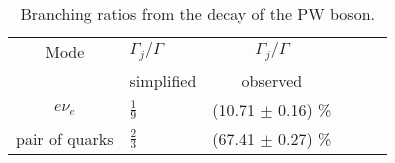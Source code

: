 \documentclass{report}
\begin{document}
\begin{table}[h!]
  \centering
  \caption{Branching ratios from the decay of the PW boson.}
  \label{tab:W_br}
  \begin{tabular}{Cl Cr Cr}
    Mode                  & $\Gamma_{j}/\Gamma$ & $\Gamma_{j}/\Gamma$\\
                          & simplified          & observed \cite{Patrignani:2016xqp}\\
    \hline
    $e\nu_{e}$            & $\frac{1}{9}$       & (10.71 $\pm$ 0.16) \%\\
    pair of quarks        & $\frac{2}{3}$       & (67.41 $\pm$ 0.27) \%
  \end{tabular}
\end{table}


\end{document}
